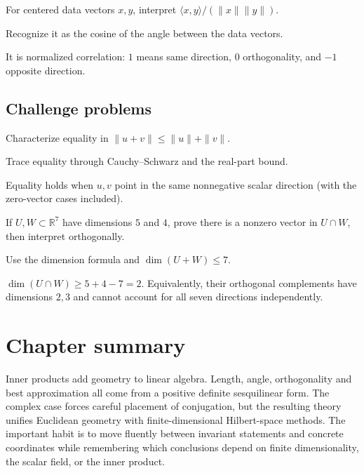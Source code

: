 \begin{exercise}\label{exr:i13-expand-14}
For centered data vectors \(x,y\), interpret \(\langle x,y\rangle/(\|x\|\|y\|)\).
\end{exercise}
\begin{hint}
Recognize it as the cosine of the angle between the data vectors.
\end{hint}
\begin{solution}
It is normalized correlation: \(1\) means same direction, \(0\) orthogonality, and \(-1\) opposite direction.
\end{solution}

\subsection*{Challenge problems}

\begin{exercise}\label{exr:i13-expand-15}
Characterize equality in \(\|u+v\|\le\|u\|+\|v\|\).
\end{exercise}
\begin{hint}
Trace equality through Cauchy--Schwarz and the real-part bound.
\end{hint}
\begin{solution}
Equality holds when \(u,v\) point in the same nonnegative scalar direction (with the zero-vector cases included).
\end{solution}

\begin{exercise}\label{exr:i13-expand-16}
If \(U,W\subset\mathbb R^7\) have dimensions \(5\) and \(4\), prove there is a nonzero vector in \(U\cap W\), then interpret orthogonally.
\end{exercise}
\begin{hint}
Use the dimension formula and \(\dim(U+W)\le7\).
\end{hint}
\begin{solution}
\(\dim(U\cap W)\ge5+4-7=2\). Equivalently, their orthogonal complements have dimensions \(2,3\) and cannot account for all seven directions independently.
\end{solution}
\section*{Chapter summary}
Inner products add geometry to linear algebra. Length, angle, orthogonality and best approximation all come from a positive definite sesquilinear form. The complex case forces careful placement of conjugation, but the resulting theory unifies Euclidean geometry with finite-dimensional Hilbert-space methods.
The important habit is to move fluently between invariant statements and concrete coordinates while remembering which conclusions depend on finite dimensionality, the scalar field, or the inner product.
